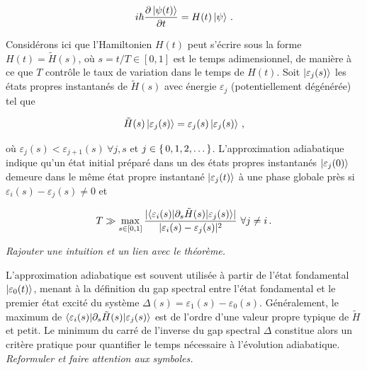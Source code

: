 
\begin{align*}
   i \hbar \frac{\partial \ket{\psi(t)}}{\partial t} = H(t) \ket{\psi} \,.
\end{align*}

Considérons ici que l'Hamiltonien $H(t)$ peut s'écrire sous la forme $H(t) = \tilde{H}(s)$, où $s=t/T \in [0,1]$ est le temps adimensionnel, de manière à ce que $T$ contrôle le taux de variation dans le temps de $H(t)$. Soit $\ket{\varepsilon_{j} (s)}$ les états propres instantanés de $\tilde{H}(s)$ avec énergie $\varepsilon_{j}$ (potentiellement dégénérée) tel que

\begin{equation}
   \tilde{H}(s) \ket{\varepsilon_{j}(s)} = \varepsilon_{j}(s) \ket{\varepsilon_{j}(s)} \,,
\end{equation}

où $\varepsilon_{j}(s) < \varepsilon_{j+1}(s) \ \forall j,s$ et $j \in \set{ 0, 1, 2, \dots }$. L'approximation adiabatique indique qu'un état initial préparé dans un des états propres instantanés $\ket{\varepsilon_{j}(0)}$ demeure dans le même état propre instantané $\ket{\varepsilon_{j}(t)}$ à une phase globale près si $\varepsilon_{i}(s) - \varepsilon_{j}(s) \neq  0$ et

\begin{equation}
    T \gg \max_{s \in [0,1]} \frac{\lvert \braket{ \varepsilon_{i}(s) | \partial_{s} \tilde{H}(s) | \varepsilon_{j}(s) } \rvert }{\lvert \varepsilon_{i}(s) - \varepsilon_{j}(s) \rvert^{2} } \ \forall j \neq i \,.
\end{equation}



\textcolor{mydarkred}{\textit{Rajouter une intuition et un lien avec le théorème.}}

L'approximation adiabatique est souvent utilisée à partir de l'état fondamental $\ket{\varepsilon_{0}(t)}$, menant à la définition du gap spectral entre l'état fondamental et le premier état excité du système $\Delta(s) = \varepsilon_{1}(s) - \varepsilon_{0}(s)$. Généralement, le maximum de $\braket{ \varepsilon_{i}(s) | \partial_{s} \tilde{H}(s) | \varepsilon_{j}(s)}$ est de l'ordre d'une valeur propre typique de $\tilde{H}$ et petit. Le minimum du carré de l'inverse du gap spectral $\Delta$ constitue alors un critère pratique pour quantifier le temps nécessaire à l'évolution adiabatique. \textcolor{mydarkred}{\textit{Reformuler et faire attention aux symboles.}}

